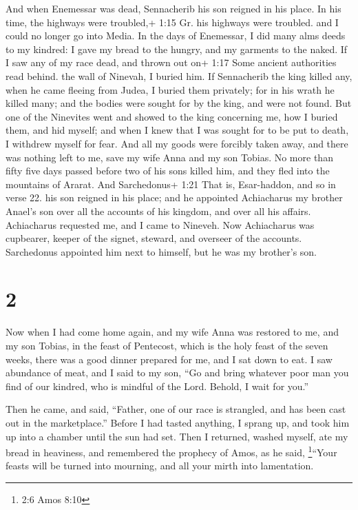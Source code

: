  And when Enemessar was dead, Sennacherib his son reigned
in his place. In his time, the highways were troubled,+ 1:15 Gr. his
highways were troubled. and I could no longer go into Media.
 In the days of Enemessar, I did many alms deeds to my
kindred: I gave my bread to the hungry,  and my garments to
the naked. If I saw any of my race dead, and thrown out on+ 1:17 Some
ancient authorities read behind. the wall of Ninevah, I buried him.
 If Sennacherib the king killed any, when he came fleeing
from Judea, I buried them privately; for in his wrath he killed many;
and the bodies were sought for by the king, and were not found.
 But one of the Ninevites went and showed to the king
concerning me, how I buried them, and hid myself; and when I knew that I
was sought for to be put to death, I withdrew myself for fear.
 And all my goods were forcibly taken away, and there was
nothing left to me, save my wife Anna and my son Tobias. 
No more than fifty five days passed before two of his sons killed him,
and they fled into the mountains of Ararat. And Sarchedonus+ 1:21 That
is, Esar-haddon, and so in verse 22. his son reigned in his place; and
he appointed Achiacharus my brother Anael's son over all the accounts of
his kingdom, and over all his affairs.  Achiacharus
requested me, and I came to Nineveh. Now Achiacharus was cupbearer,
keeper of the signet, steward, and overseer of the accounts. Sarchedonus
appointed him next to himself, but he was my brother's son.

\hypertarget{section-1}{%
\section{2}\label{section-1}}

 Now when I had come home again, and my wife Anna was
restored to me, and my son Tobias, in the feast of Pentecost, which is
the holy feast of the seven weeks, there was a good dinner prepared for
me, and I sat down to eat.  I saw abundance of meat, and I
said to my son, ``Go and bring whatever poor man you find of our
kindred, who is mindful of the Lord. Behold, I wait for you.''

 Then he came, and said, ``Father, one of our race is
strangled, and has been cast out in the marketplace.'' 
Before I had tasted anything, I sprang up, and took him up into a
chamber until the sun had set.  Then I returned, washed
myself, ate my bread in heaviness,  and remembered the
prophecy of Amos, as he said, \footnote{2:6 Amos 8:10}``Your feasts will
be turned into mourning, and all your mirth into lamentation.

